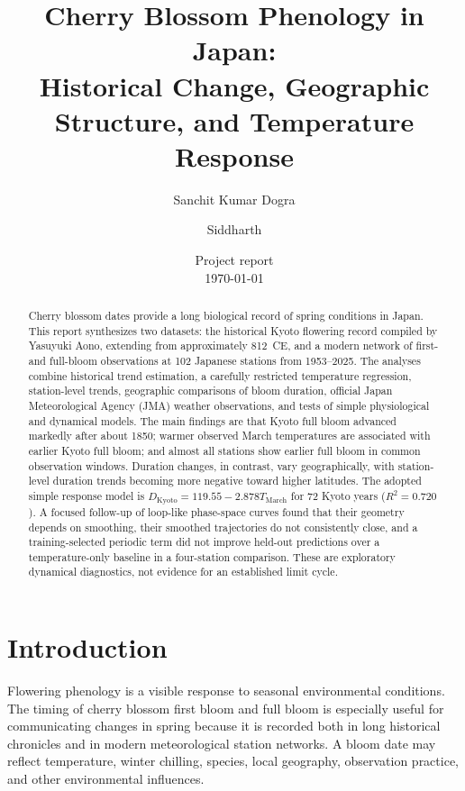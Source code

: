 \documentclass[11pt,a4paper]{article}
\title{\textbf{Cherry Blossom Phenology in Japan:}\\[0.3em]
\large Historical Change, Geographic Structure, and Temperature Response}
\author{Sanchit Kumar Dogra \and Siddharth}
\date{Project report\\[0.25em]\today}
\begin{document}
\maketitle

\begin{abstract}
Cherry blossom dates provide a long biological record of spring conditions in Japan. This report synthesizes two datasets: the historical Kyoto flowering record compiled by Yasuyuki Aono, extending from approximately 812~CE, and a modern network of first- and full-bloom observations at 102 Japanese stations from 1953--2025. The analyses combine historical trend estimation, a carefully restricted temperature regression, station-level trends, geographic comparisons of bloom duration, official Japan Meteorological Agency (JMA) weather observations, and tests of simple physiological and dynamical models. The main findings are that Kyoto full bloom advanced markedly after about 1850; warmer observed March temperatures are associated with earlier Kyoto full bloom; and almost all stations show earlier full bloom in common observation windows. Duration changes, in contrast, vary geographically, with station-level duration trends becoming more negative toward higher latitudes. The adopted simple response model is $D_{\mathrm{Kyoto}}=119.55-2.878T_{\mathrm{March}}$ for 72 Kyoto years ($R^2=0.720$). A focused follow-up of loop-like phase-space curves found that their geometry depends on smoothing, their smoothed trajectories do not consistently close, and a training-selected periodic term did not improve held-out predictions over a temperature-only baseline in a four-station comparison. These are exploratory dynamical diagnostics, not evidence for an established limit cycle.
\end{abstract}

\tableofcontents
\newpage

\section{Introduction}

Flowering phenology is a visible response to seasonal environmental conditions. The timing of cherry blossom first bloom and full bloom is especially useful for communicating changes in spring because it is recorded both in long historical chronicles and in modern meteorological station networks. A bloom date may reflect temperature, winter chilling, species, local geography, observation practice, and other environmental influences.
\end{document}
